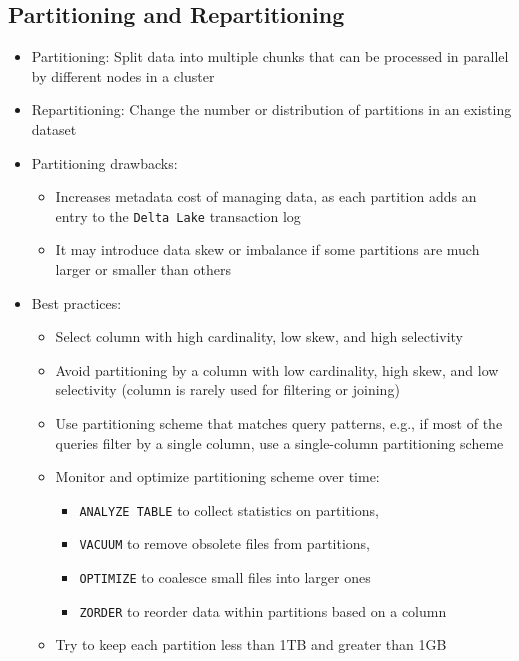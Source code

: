 \documentclass[11pt]{scrartcl}
\begin{document}
\subsection{Partitioning and Repartitioning}
\begin{itemize}
	\item Partitioning: Split data into multiple chunks that can be processed in parallel by different nodes in a cluster
	\item Repartitioning: Change the number or distribution of partitions in an existing dataset
	\item Partitioning drawbacks:
	\begin{itemize}
		\item Increases metadata cost of managing data, as each partition adds an entry to the \texttt{Delta Lake} transaction log
		\item It may introduce data skew or imbalance if some partitions are much larger or smaller than others
	\end{itemize}
	\item Best practices:
	\begin{itemize}
		\item Select column with high cardinality, low skew, and high selectivity
		\item Avoid partitioning by a column with low cardinality, high skew, and low selectivity (column is rarely used for filtering or joining)
		\item Use partitioning scheme that matches query patterns, e.g., if most of the queries filter by a single column, use a single-column partitioning scheme
		\item Monitor and optimize partitioning scheme over time:
		\begin{itemize}
			\item \texttt{ANALYZE TABLE} to collect statistics on partitions,
			\item \texttt{VACUUM} to remove obsolete files from partitions,
			\item \texttt{OPTIMIZE} to coalesce small files into larger ones
			\item \texttt{ZORDER} to reorder data within partitions based on a column
		\end{itemize}   
		\item Try to keep each partition less than 1TB and greater than 1GB
	\end{itemize}
\end{itemize}
\end{document}
